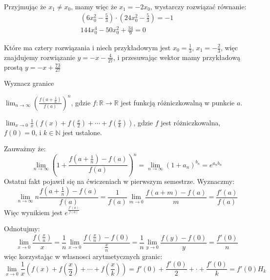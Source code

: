 \documentclass[12pt]{scrartcl}
\begin{document}
    Przyjmując że $x_{1} \not = x_{0}$, mamy więc że $x_{1} = - 2 x_{0}$, wystarczy rozwiązać równanie:
    \begin{gather*}
        \left ( 6 x^2_0 - \frac{5}{3} \right ) \cdot \left ( 24 x^2_0 - \frac{5}{3} \right ) = -1 \\
        144 x^4_0 - 50 x^2_0 + \frac{34}{9} = 0
    \end{gather*}

    Które ma cztery rozwiązania i niech przykładowym jest $x_0 = \frac{1}{3}$, $x_{1} = - \frac{2}{3}$, więc znajdujemy rozwiązanie $y = - x - \frac{4}{27}$, i przesuwając wektor mamy przykładową prostą $y = -x + \frac{73}{27}$
    \begin{zadanie}
        Wyznacz granice
        \begin{walk}
            \item $\lim_{n \to \infty } \left ( \frac{f(a + \frac{1}{n})}{f(a)} \right )^n $, gdzie $f: \mathbb{R}  \to \mathbb{R} $ jest funkcją różniczkowalną w punkcie $a$.
            \item $\lim_{x \to 0} \frac{1}{x} \left ( f(x) + f(\frac{x}{2}) + \cdots + f(\frac{x}{k})\right ) $, gdzie $f$ jest różniczkowalna, $f(0) = 0$, i $k \in \mathbb{N}$ jest ustalone. 
        \end{walk}
    \end{zadanie}
    
    \begin{walk}
        \item Zauważmy że:
          \[
            \lim_{n \to \infty } \left ( 1+ \frac{f(a + \frac{1}{n}) - f(a)}{f(a)} \right )^n = \lim_{n \to \infty } \left ( 1 + a_n \right )^{b_n} = e^{a_n b_n}  
          \]
          Ostatni fakt pojawił się na ćwiczeniach w pierwszym semestrze.
          Wyznaczmy:
          \[
              \lim_{n \to \infty } n \frac{f \left ( a + \frac{1}{n} \right ) - f(a)}{f(a)} = \frac{1}{f(a)} \lim_{m \to 0 } \frac{f(a + m) - f(a)}{m} = \frac{f'(a)}{f(a)}
          \]
          Więc wynikiem jest $e^{\frac{f'(a)}{f(a)}}$
        \item Odnotujmy:
          \[
             \lim_{x \to 0}  \frac{f(\frac{x}{n})}{x} = \frac{1}{n} \lim_{x \to 0} \frac{f(\frac{x}{n}) - f(0)}{\frac{x}{n}} = \frac{1}{n} \lim_{y \to 0 } \frac{f(y) - f(0)}{y} = \frac{f'(0)}{n}  
          \]
          więc korzystając w własnosci arytmetycznych granic:
          \[
             \lim_{x \to 0} \frac{1}{x} \left ( f \left ( x \right ) + f \left ( \frac{x}{2} \right ) + \cdots  + f \left ( \frac{x}{k} \right )\right ) = f'(0) + \frac{f'(0)}{2} + \cdot + \frac{f'(0)}{k} = f'(0) H_k 
          \]
    \end{walk}
\end{document}
